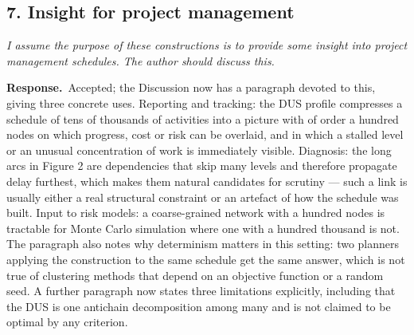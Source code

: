 \documentclass[11pt,a4paper]{article}
\newcommand{\rev}[1]{\medskip\noindent\textit{#1}\par\medskip}
\newcommand{\reply}{\noindent\textbf{Response.}\ }
\begin{document}
\subsection*{7. Insight for project management}

\rev{I assume the purpose of these constructions is to provide some insight into
project management schedules. The author should discuss this.}

\reply Accepted; the Discussion now has a paragraph devoted to this, giving
three concrete uses. Reporting and tracking: the DUS profile compresses a
schedule of tens of thousands of activities into a picture with of order a
hundred nodes on which progress, cost or risk can be overlaid, and in which a
stalled level or an unusual concentration of work is immediately visible.
Diagnosis: the long arcs in Figure 2 are dependencies that skip many levels and
therefore propagate delay furthest, which makes them natural candidates for
scrutiny --- such a link is usually either a real structural constraint or an
artefact of how the schedule was built. Input to risk models: a coarse-grained
network with a hundred nodes is tractable for Monte Carlo simulation where one
with a hundred thousand is not. The paragraph also notes why determinism matters
in this setting: two planners applying the construction to the same schedule get
the same answer, which is not true of clustering methods that depend on an
objective function or a random seed. A further paragraph now states three
limitations explicitly, including that the DUS is one antichain decomposition
among many and is not claimed to be optimal by any criterion.
\end{document}

